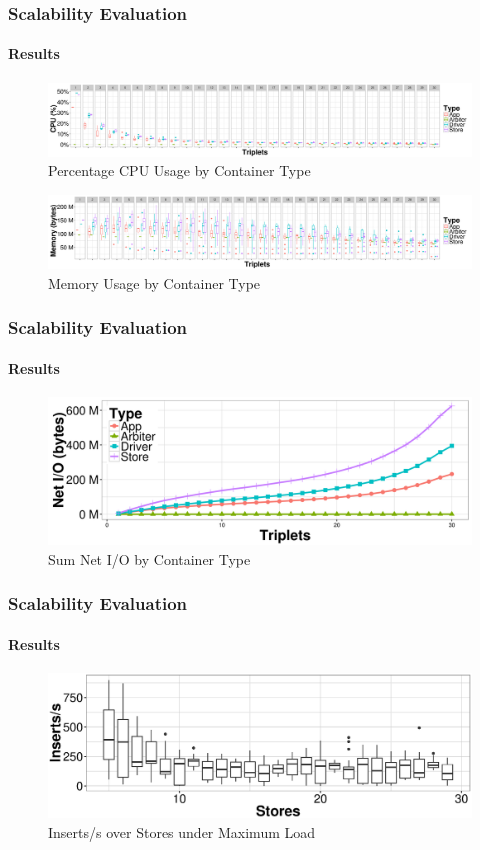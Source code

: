 \documentclass[aspectratio=169]{beamer}
\begin{document}
\begin{frame}
	\frametitle{Scalability Evaluation}
	\framesubtitle{Results}

	\begin{figure}
		\centering
		\includegraphics[width=0.8\linewidth]{cpu-bins}
		\caption{Percentage CPU Usage by Container Type}
	\end{figure}

	\begin{figure}
		\centering
		\includegraphics[width=0.8\linewidth]{mem-bins}
		\caption{Memory Usage by Container Type}
	\end{figure}
\end{frame}

\begin{frame}
	\frametitle{Scalability Evaluation}
	\framesubtitle{Results}

	\begin{figure}
		\centering
		\includegraphics[width=\linewidth]{io-bins}
		\caption{Sum Net I/O by Container Type}
	\end{figure}
\end{frame}

\begin{frame}
	\frametitle{Scalability Evaluation}
	\framesubtitle{Results}

	\begin{figure}
		\centering
		\includegraphics[width=\linewidth]{stores}
		\caption{Inserts/s over Stores under Maximum Load}
	\end{figure}
\end{frame}
\end{document}
